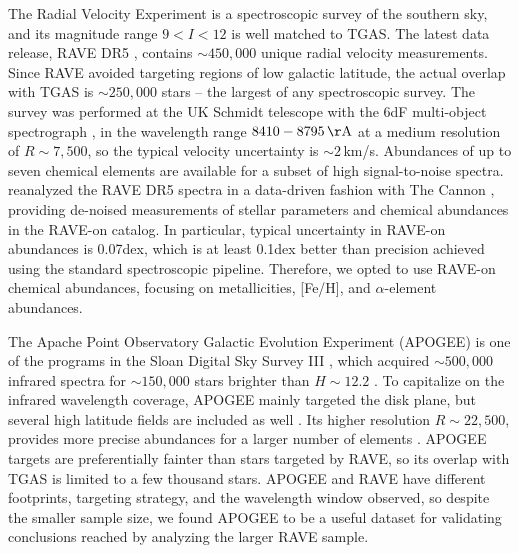 \documentclass[apj, twocolappendix, numberedappendix, appendixfloats]{emulateapj}
\begin{document}
The Radial Velocity Experiment \citep[RAVE,][]{steinmetz2006} is a spectroscopic survey of the southern sky, and its magnitude range $9<I<12$ is well matched to TGAS.
The latest data release, RAVE DR5 \citep{kunder2017}, contains $\sim450,000$ unique radial velocity measurements.
Since RAVE avoided targeting regions of low galactic latitude, the actual overlap with TGAS is $\sim250,000$ stars -- the largest of any spectroscopic survey.
The survey was performed at the UK Schmidt telescope with the 6dF multi-object spectrograph \citep{6df}, in the wavelength range $8410-8795\,\rm\AA$ at a medium resolution of $R\sim7,500$, so the typical velocity uncertainty is $\sim2$\,km/s.
Abundances of up to seven chemical elements are available for a subset of high signal-to-noise spectra.
\citet{casey2016} reanalyzed the RAVE DR5 spectra in a data-driven fashion with The Cannon \citep{ness2015}, providing de-noised measurements of stellar parameters and chemical abundances in the RAVE-on catalog.
In particular, typical uncertainty in RAVE-on abundances is 0.07\;dex, which is at least 0.1\;dex better than precision achieved using the standard spectroscopic pipeline.
Therefore, we opted to use RAVE-on chemical abundances, focusing on metallicities, [Fe/H], and $\alpha$-element abundances.

The Apache Point Observatory Galactic Evolution Experiment (APOGEE) is one of the programs in the Sloan Digital Sky Survey III \citep{majewski2015, sdss3}, which acquired $\sim500,000$ infrared spectra for $\sim150,000$ stars brighter than $H\sim12.2$ \citep{holtzman2015}.
To capitalize on the infrared wavelength coverage, APOGEE mainly targeted the disk plane, but several high latitude fields are included as well \citep{zasowski2013}.
Its higher resolution $R\sim22,500$, provides more precise abundances for a larger number of elements \citep[e.g.,][]{ness2015}.
APOGEE targets are preferentially fainter than stars targeted by RAVE, so its overlap with TGAS is limited to a few thousand stars.
APOGEE and RAVE have different footprints, targeting strategy, and the wavelength window observed, so despite the smaller sample size, we found APOGEE to be a useful dataset for validating conclusions reached by analyzing the larger RAVE sample.
\end{document}
